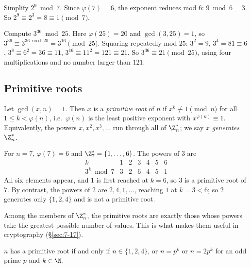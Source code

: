\begin{example}
Simplify $2^9\bmod7$. Since $\varphi(7)=6$, the exponent reduces mod $6$: $9\bmod6=3$. So $2^9\equiv2^3=8\equiv1\pmod7$.
\end{example}

\begin{example}
Compute $3^{36}\bmod25$. Here $\varphi(25)=20$ and $\gcd(3,25)=1$, so $3^{36}\equiv3^{36\bmod20}=3^{16}\pmod{25}$. Squaring repeatedly mod $25$: $3^2=9$, $3^4=81\equiv6$, $3^8\equiv6^2=36\equiv11$, $3^{16}\equiv11^2=121\equiv21$. So $3^{36}\equiv21\pmod{25}$, using four multiplications and no number larger than $121$.
\end{example}

\subsection{Primitive roots}
\label{sec:7-15}

\begin{definition}
Let $\gcd(x,n)=1$. Then $x$ is a \emph{primitive root} of $n$ if $x^k\not\equiv1\pmod n$ for all $1\le k<\varphi(n)$, i.e.\ $\varphi(n)$ is the least positive exponent with $x^{\varphi(n)}\equiv1$. Equivalently, the powers $x,x^2,x^3,\dots$ run through all of $\Z_n^*$; we say $x$ \emph{generates} $\Z_n^*$.
\end{definition}

\begin{example}
For $n=7$, $\varphi(7)=6$ and $\Z_7^*=\{1,\dots,6\}$. The powers of $3$ are
\[
\begin{array}{c|cccccc}
k & 1&2&3&4&5&6\\\hline
3^k\bmod7 & 3&2&6&4&5&1
\end{array}
\]
All six elements appear, and $1$ is first reached at $k=6$, so $3$ is a primitive root of $7$. By contrast, the powers of $2$ are $2,4,1,\dots$, reaching $1$ at $k=3<6$; so $2$ generates only $\{1,2,4\}$ and is not a primitive root.
\end{example}

\begin{note}
Among the members of $\Z_n^*$, the primitive roots are exactly those whose powers take the greatest possible number of values. This is what makes them useful in cryptography (\S\ref{sec:7-17}).
\end{note}

\begin{theorem}
\label{thm:primrootexists}
$n$ has a primitive root if and only if $n\in\{1,2,4\}$, or $n=p^k$ or $n=2p^k$ for an odd prime $p$ and $k\in\N$.
\end{theorem}

